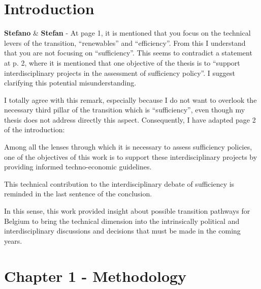 \documentclass[12pt,a4paper]{article}
\begin{document}
\section{Introduction}
\label{Introduction}

\begin{mdframed}[style=comment] %
{\color{orange} \textbf{Stefano}} \& {\color{teal} \textbf{Stefan}} - At page 1, it is mentioned that you focus on the technical levers of the transition, ``renewables'' and ``efficiency''. From this I understand that you are not focusing on ``sufficiency''. This seems to contradict a statement at p. 2, where it is mentioned that one objective of the thesis is to ``support interdisciplinary projects in the assessment of sufficiency policy''. I suggest clarifying this potential misunderstanding.  
\end{mdframed}

\noindent I totally agree with this remark, especially because I do not want to overlook the necessary third pillar of the transition which is ``sufficiency'', even though my thesis does not address directly this aspect. Consequently, I have adapted {\color{blue} page 2 of the introduction}:

\begin{mdframed}[style=manuscript] %
Among all the lenses through which it is necessary to assess sufficiency policies, one of the objectives of this work is to support these interdisciplinary projects by providing informed techno-economic guidelines.
\end{mdframed}

\noindent This technical contribution to the interdisciplinary debate of sufficiency is reminded in {\color{blue} the last sentence of the conclusion}.

\begin{mdframed}[style=manuscript] %
In this sense, this work provided insight about possible transition pathways for Belgium to bring the technical dimension into the intrinsically political and interdisciplinary discussions and decisions that must be made in the coming years.
\end{mdframed}

\section{Chapter 1 - Methodology}
\label{methodo}
\end{document}
